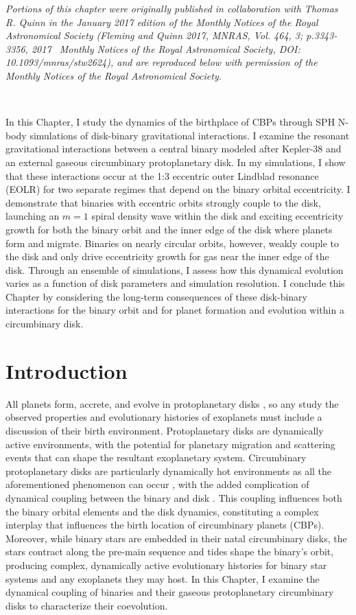 \textit{Portions of this chapter were originally published in collaboration with Thomas R. Quinn in the January 2017 edition of the Monthly Notices of the Royal Astronomical Society (Fleming and Quinn 2017, MNRAS, Vol. 464, 3; p.3343-3356, 2017 \textcopyright \ Monthly Notices of the Royal Astronomical Society, DOI: 10.1093/mnras/stw2624), and are reproduced below with permission of the Monthly Notices of the Royal Astronomical Society.}

\

In this Chapter, I study the dynamics of the birthplace of CBPs through SPH N-body simulations of disk-binary gravitational interactions. I examine the resonant gravitational interactions between a central binary modeled after Kepler-38 and an external gaseous circumbinary protoplanetary disk. In my simulations, I show that these interactions occur at the 1:3 eccentric outer Lindblad resonance (EOLR) for two separate regimes that depend on the binary orbital eccentricity. I demonstrate that binaries with eccentric orbits strongly couple to the disk, launching an $m=1$ spiral density wave within the disk and exciting eccentricity growth for both the binary orbit and the inner edge of the disk where planets form and migrate. Binaries on nearly circular orbits, however, weakly couple to the disk and only drive eccentricity growth for gas near the inner edge of the disk. Through an ensemble of simulations, I assess how this dynamical evolution varies as a function of disk parameters and simulation resolution. I conclude this Chapter by considering the long-term consequences of these disk-binary interactions for the binary orbit and for planet formation and evolution within a circumbinary disk.

\section{Introduction}

All planets form, accrete, and evolve in protoplanetary disks \citep[e.g.][]{Lin1996,Nelson2000,Papaloizou2006,Rogers2011,Bodenheimer2014}, so any study the observed properties and evolutionary histories of exoplanets must include a discussion of their birth environment.  Protoplanetary disks are dynamically active environments, with the potential for planetary migration and scattering events that can shape the resultant exoplanetary system.  Circumbinary protoplanetary disks are particularly dynamically hot environments as all the aforementioned phenomenon can occur \citep[e.g.][]{Pierens2013}, with the added complication of dynamical coupling between the binary and disk \citep{Papaloizou2001}.  This coupling influences both the binary orbital elements and the disk dynamics, constituting a complex interplay that influences the birth location of circumbinary planets (CBPs).  Moreover, while binary stars are embedded in their natal circumbinary disks, the stars contract along the pre-main sequence and tides shape the binary's orbit, producing complex, dynamically active evolutionary histories for binary star systems and any exoplanets they may host.  In this Chapter, I examine the dynamical coupling of binaries and their gaseous protoplanetary circumbinary disks to characterize their coevolution.

